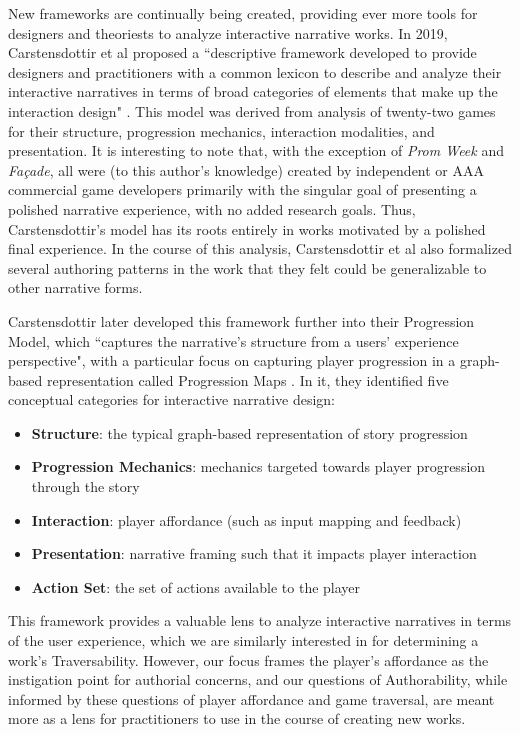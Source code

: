 New frameworks are continually being created, providing ever more tools for designers and theoriests to analyze interactive narrative works. In 2019, Carstensdottir et al proposed a ``descriptive framework developed to provide designers and practitioners with a common lexicon to describe and analyze their interactive narratives in terms of broad categories of elements that make up the interaction design" \cite{carstensdottir}. This model was derived from analysis of twenty-two games for their structure, progression mechanics, interaction modalities, and presentation. It is interesting to note that, with the exception of \textit{Prom Week} and \textit{Façade}, all were (to this author's knowledge) created by independent or AAA commercial game developers primarily with the singular goal of presenting a polished narrative experience, with no added research goals. Thus, Carstensdottir's model has its roots entirely in works motivated by a polished final experience. In the course of this analysis, Carstensdottir et al also formalized several authoring patterns in the work that they felt could be generalizable to other narrative forms.

Carstensdottir later developed this framework further into their Progression Model, which ``captures the narrative's structure from a users’ experience perspective", with a particular focus on capturing player progression in a graph-based representation called Progression Maps \cite{carstensdottir_diss}. In it, they identified five conceptual categories for interactive narrative design:

\begin{itemize}
    \item \textbf{Structure}: the typical graph-based representation of story progression
    \item \textbf{Progression Mechanics}: mechanics targeted towards player progression through the story
    \item \textbf{Interaction}: player affordance (such as input mapping and feedback)
    \item \textbf{Presentation}: narrative framing such that it impacts player interaction
    \item \textbf{Action Set}: the set of actions available to the player
\end{itemize}

This framework provides a valuable lens to analyze interactive narratives in terms of the user experience, which we are similarly interested in for determining a work's Traversability. However, our focus frames the player's affordance as the instigation point for authorial concerns, and our questions of Authorability, while informed by these questions of player affordance and game traversal, are meant more as a lens for practitioners to use in the course of creating new works.

